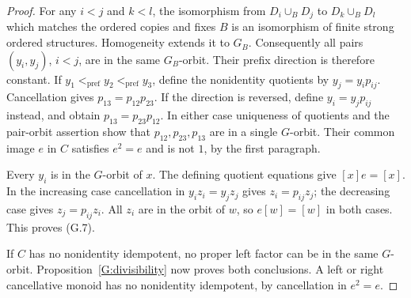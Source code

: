 \begin{proof}
For any $i<j$ and $k<l$, the isomorphism from
$D_i\cup_B D_j$ to $D_k\cup_B D_l$ which matches the ordered
copies and fixes $B$ is an isomorphism of finite strong ordered
structures.  Homogeneity extends it to $G_B$.  Consequently
all pairs $(y_i,y_j)$, $i<j$, are in the same $G_B$-orbit.
Their prefix direction is therefore constant.  If
$y_1<_{\mathrm{pref}}y_2<_{\mathrm{pref}}y_3$, define the
nonidentity quotients by $y_j=y_i p_{ij}$.  Cancellation gives
$p_{13}=p_{12}p_{23}$.  If the direction is reversed, define
$y_i=y_j p_{ij}$ instead, and obtain
$p_{13}=p_{23}p_{12}$.  In either case uniqueness of quotients
and the pair-orbit assertion show that $p_{12},p_{23},p_{13}$
are in a single $G$-orbit.  Their common image $e$ in $C$
satisfies $e^2=e$ and is not $1$, by the first paragraph.

Every $y_i$ is in the $G$-orbit of $x$.  The defining quotient
equations give $[x]e=[x]$.  In the increasing case cancellation
in $y_i z_i=y_j z_j$ gives $z_i=p_{ij}z_j$; the decreasing
case gives $z_j=p_{ij}z_i$.  All $z_i$ are in the orbit of
$w$, so $e[w]=[w]$ in both cases.  This proves (G.7).

If $C$ has no nonidentity idempotent, no proper left factor
can be in the same $G$-orbit.  Proposition~\ref{G:divisibility}
now proves both conclusions.  A left or right cancellative
monoid has no nonidentity idempotent, by cancellation in
$e^2=e$.
\end{proof}

